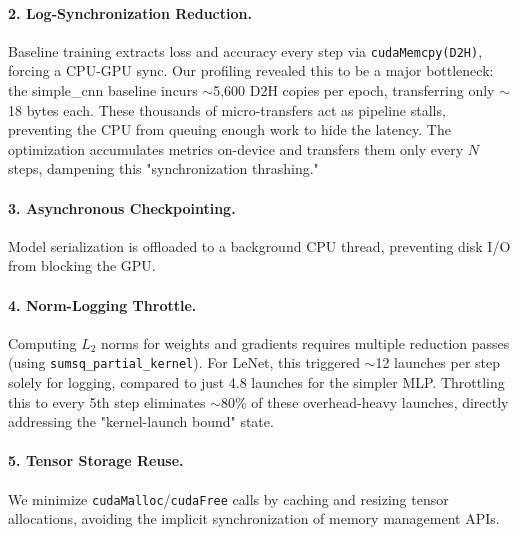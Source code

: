 \documentclass[10pt,twocolumn,letterpaper]{article}
\begin{document}
\paragraph{2. Log-Synchronization Reduction.}
Baseline training extracts loss and accuracy every step via \texttt{cudaMemcpy(D2H)}, forcing a CPU-GPU sync.
Our profiling revealed this to be a major bottleneck: the simple_cnn baseline incurs $\sim$5,600 D2H copies per epoch, transferring only $\sim$18 bytes each. These thousands of micro-transfers act as pipeline stalls, preventing the CPU from queuing enough work to hide the latency.
The optimization accumulates metrics on-device and transfers them only every $N$ steps, dampening this "synchronization thrashing."

\paragraph{3. Asynchronous Checkpointing.}
Model serialization is offloaded to a background CPU thread, preventing disk I/O from blocking the GPU.

\paragraph{4. Norm-Logging Throttle.}
Computing $L_2$ norms for weights and gradients requires multiple reduction passes (using \texttt{sumsq\_partial\_kernel}).
For LeNet, this triggered $\sim$12 launches per step solely for logging, compared to just 4.8 launches for the simpler MLP. Throttling this to every 5th step eliminates $\sim$80\% of these overhead-heavy launches, directly addressing the "kernel-launch bound" state.

\paragraph{5. Tensor Storage Reuse.}
We minimize \texttt{cudaMalloc}/\texttt{cudaFree} calls by caching and resizing tensor allocations, avoiding the implicit synchronization of memory management APIs.
\end{document}
